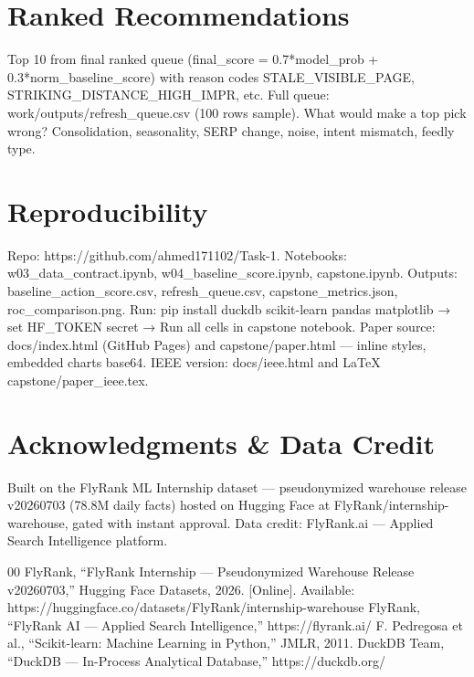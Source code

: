 \documentclass[conference]{IEEEtran}
\begin{document}
\section{Ranked Recommendations}
Top 10 from final ranked queue (final\_score = 0.7*model\_prob + 0.3*norm\_baseline\_score) with reason codes STALE\_VISIBLE\_PAGE, STRIKING\_DISTANCE\_HIGH\_IMPR, etc. Full queue: work/outputs/refresh\_queue.csv (100 rows sample). What would make a top pick wrong? Consolidation, seasonality, SERP change, noise, intent mismatch, feedly type.

\section{Reproducibility}
Repo: https://github.com/ahmed171102/Task-1. Notebooks: w03\_data\_contract.ipynb, w04\_baseline\_score.ipynb, capstone.ipynb. Outputs: baseline\_action\_score.csv, refresh\_queue.csv, capstone\_metrics.json, roc\_comparison.png. Run: pip install duckdb scikit-learn pandas matplotlib → set HF\_TOKEN secret → Run all cells in capstone notebook. Paper source: docs/index.html (GitHub Pages) and capstone/paper.html — inline styles, embedded charts base64. IEEE version: docs/ieee.html and LaTeX capstone/paper\_ieee.tex.

\section{Acknowledgments \& Data Credit}
Built on the FlyRank ML Internship dataset — pseudonymized warehouse release v20260703 (78.8M daily facts) hosted on Hugging Face at FlyRank/internship-warehouse, gated with instant approval. Data credit: FlyRank.ai — Applied Search Intelligence platform.

\begin{thebibliography}{00}
 FlyRank, “FlyRank Internship — Pseudonymized Warehouse Release v20260703,” Hugging Face Datasets, 2026. [Online]. Available: https://huggingface.co/datasets/FlyRank/internship-warehouse
 FlyRank, “FlyRank AI — Applied Search Intelligence,” https://flyrank.ai/
 F. Pedregosa et al., “Scikit-learn: Machine Learning in Python,” JMLR, 2011.
 DuckDB Team, “DuckDB — In-Process Analytical Database,” https://duckdb.org/
\end{thebibliography}
\end{document}
